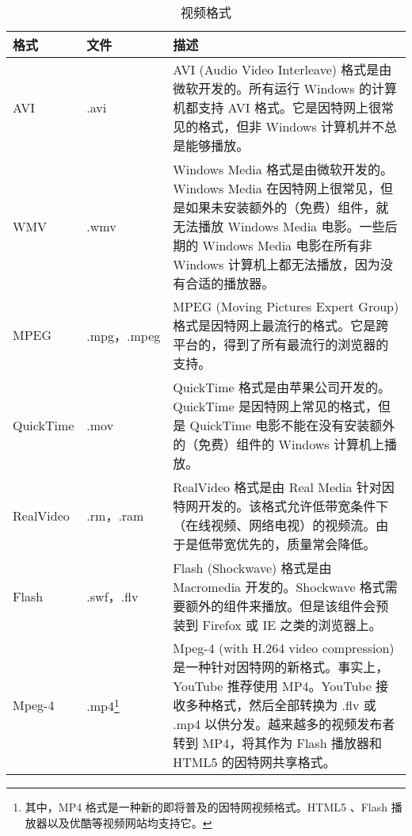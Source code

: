 \begin{table}[!h]
\centering
\caption{视频格式}
\begin{tabular}{|p{50pt}|p{50pt}|p{200pt}|}
\hline
格式		&文件			&描述		\\
\hline
AVI		&.avi			&AVI (Audio Video Interleave) 格式是由微软开发的。所有运行 Windows 的计算机都支持 AVI 格式。它是因特网上很常见的格式，但非 Windows 计算机并不总是能够播放。\\
\hline
WMV	&.wmv			&Windows Media 格式是由微软开发的。Windows Media 在因特网上很常见，但是如果未安装额外的（免费）组件，就无法播放 Windows Media 电影。一些后期的 Windows Media 电影在所有非 Windows 计算机上都无法播放，因为没有合适的播放器。\\
\hline
MPEG	&.mpg，.mpeg	&MPEG (Moving Pictures Expert Group) 格式是因特网上最流行的格式。它是跨平台的，得到了所有最流行的浏览器的支持。\\
\hline
QuickTime&.mov			&QuickTime 格式是由苹果公司开发的。QuickTime 是因特网上常见的格式，但是 QuickTime 电影不能在没有安装额外的（免费）组件的 Windows 计算机上播放。\\
\hline
RealVideo&.rm，.ram		&RealVideo 格式是由 Real Media 针对因特网开发的。该格式允许低带宽条件下（在线视频、网络电视）的视频流。由于是低带宽优先的，质量常会降低。\\
\hline
Flash 	&.swf，.flv 		&Flash (Shockwave) 格式是由 Macromedia 开发的。Shockwave 格式需要额外的组件来播放。但是该组件会预装到 Firefox 或 IE 之类的浏览器上。\\
\hline
Mpeg-4	&.mp4\footnote{其中，MP4 格式是一种新的即将普及的因特网视频格式。HTML5 、Flash 播放器以及优酷等视频网站均支持它。}			&Mpeg-4 (with H.264 video compression) 是一种针对因特网的新格式。事实上，YouTube 推荐使用 MP4。YouTube 接收多种格式，然后全部转换为 .flv 或 .mp4 以供分发。越来越多的视频发布者转到 MP4，将其作为 Flash 播放器和 HTML5 的因特网共享格式。\\
\hline
\end{tabular}
\end{table}


